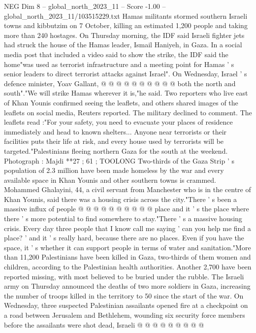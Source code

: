 \begin{textsample}{NEG Dim 8 – global\_north\_2023\_11 – Score -1.00 – global\_north\_2023\_11/103515229.txt}
Hamas militants stormed southern Israeli towns and kibbutzim on 7 October, killing an estimated 1,200 people and taking more than 240 hostages.
On Thursday morning, the IDF said Israeli fighter jets had struck the house of the Hamas leader, Ismail Haniyeh, in Gaza.
In a social media post that included a video said to show the strike, the IDF said the home"was used as terrorist infrastructure and a meeting point for Hamas ' s senior leaders to direct terrorist attacks against Israel".
On Wednesday, Israel ' s defence minister, Yoav Gallant, @ @ @ @ @ @ @ @ @ @ both the north and south"."We will strike Hamas wherever it is,"he said.
Two reporters who live east of Khan Younis confirmed seeing the leaflets, and others shared images of the leaflets on social media, Reuters reported.
The military declined to comment.
The leaflets read :"For your safety, you need to evacuate your places of residence immediately and head to known shelters...
Anyone near terrorists or their facilities puts their life at risk, and every house used by terrorists will be targeted."Palestinians fleeing northern Gaza for the south at the weekend.
Photograph : Majdi **27 ; 61 ; TOOLONG Two-thirds of the Gaza Strip ' s population of 2.3 million have been made homeless by the war and every available space in Khan Younis and other southern towns is crammed.
Mohammed Ghalayini, 44, a civil servant from Manchester who is in the centre of Khan Younis, said there was a housing crisis across the city."There ' s been a massive influx of people @ @ @ @ @ @ @ @ @ @ place and it ' s the place where there ' s more potential to find somewhere to stay."There ' s a massive housing crisis.
Every day three people that I know call me saying ' can you help me find a place? ' and it ' s really hard, because there are no places.
Even if you have the space, it ' s whether it can support people in terms of water and sanitation."More than 11,200 Palestinians have been killed in Gaza, two-thirds of them women and children, according to the Palestinian health authorities.
Another 2,700 have been reported missing, with most believed to be buried under the rubble.
The Israeli army on Thursday announced the deaths of two more soldiers in Gaza, increasing the number of troops killed in the territory to 50 since the start of the war.
On Wednesday, three suspected Palestinian assailants opened fire at a checkpoint on a road between Jerusalem and Bethlehem, wounding six security force members before the assailants were shot dead, Israeli @ @ @ @ @ @ @ @ @

\end{textsample}
